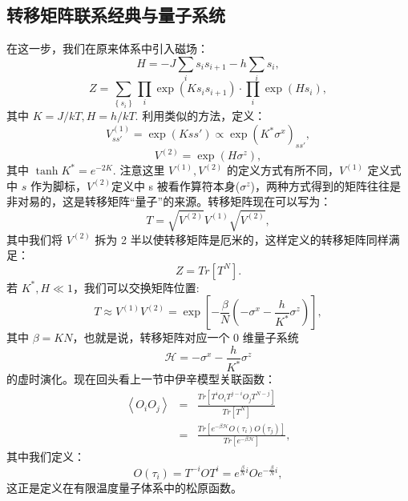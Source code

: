 \documentclass[UTF8]{ctexart}
\begin{document}
\subsection*{转移矩阵联系经典与量子系统}
\noindent
在这一步，我们在原来体系中引入磁场：
\begin{equation}
H=-J\sum_{i}s_{i}s_{i+1}-h\sum_{i}s_{i},
\end{equation}
\begin{equation}
Z=\sum_{\left\{ s_{i}\right\} }\prod_{i}\exp\left(Ks_{i}s_{i+1}\right)\cdot\prod_{i}\exp\left(Hs_{i}\right),
\end{equation}
其中 $K=J/kT,H=h/kT$. 利用类似的方法，定义：
\begin{equation}
V_{ss'}^{(1)}=\exp\left(Kss'\right)\propto\exp\left(K^{*}\sigma^{x}\right)_{ss'},
\end{equation}
\begin{equation}
V^{(2)}=\exp\left(H\sigma^{z}\right),
\end{equation}
其中 $\tanh K^{*}=e^{-2K}.$ 注意这里 $V^{(1)},V^{(2)}$ 的定义方式有所不同，$V^{(1)}$
定义式中 $s$ 作为脚标，$V^{(2)}$定义中 s 被看作算符本身($\sigma^{z}$)，两种方式得到的矩阵往往是非对易的，这是转移矩阵“量子”的来源。转移矩阵现在可以写为：
\begin{equation}
T=\sqrt{V^{(2)}}V^{(1)}\sqrt{V^{(2)}},
\end{equation}
其中我们将 $V^{(2)}$ 拆为 2 半以使转移矩阵是厄米的，这样定义的转移矩阵同样满足：
\begin{equation}
Z=Tr\left[T^{N}\right].
\end{equation}
若 $K^{*},H\ll1$，我们可以交换矩阵位置:
\begin{equation}
T\approx V^{(1)}V^{(2)}=\exp\left[-\frac{\beta}{N}\left(-\sigma^{x}-\frac{h}{K^{*}}\sigma^{z}\right)\right],
\end{equation}
其中 $\beta=KN$，也就是说，转移矩阵对应一个 0 维量子系统
\begin{equation}
\mathcal{H}=-\sigma^{x}-\frac{h}{K^{*}}\sigma^{z}
\end{equation}
的虚时演化。现在回头看上一节中伊辛模型关联函数：
\begin{eqnarray}
\left\langle O_{i}O_{j}\right\rangle  & = & \frac{Tr\left[T^{i}O_{i}T^{j-i}O_{j}T^{N-j}\right]}{Tr\left[T^{N}\right]}\nonumber \\
 & = & \frac{Tr\left[e^{-\beta\mathcal{H}}O\left(\tau_{i}\right)O\left(\tau_{j}\right)\right]}{Tr\left[e^{-\beta\mathcal{H}}\right]},
\end{eqnarray}
其中我们定义：
\begin{equation}
O\left(\tau_{i}\right)=T^{-i}OT^{i}=e^{\frac{\beta}{N}i}Oe^{-\frac{\beta}{N}i},
\end{equation}
这正是定义在有限温度量子体系中的松原函数。
\end{document}
